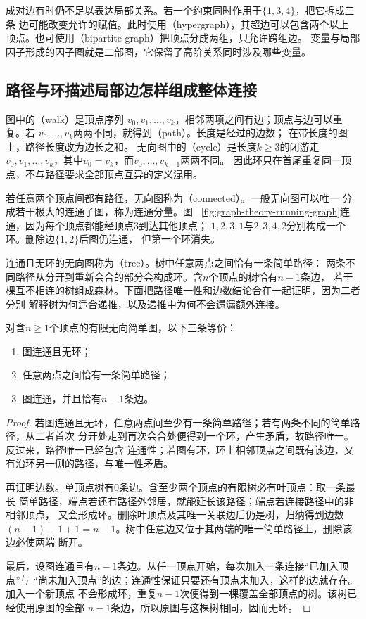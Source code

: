 成对边有时仍不足以表达局部关系。若一个约束同时作用于\(\{1,3,4\}\)，把它拆成三条
边可能改变允许的赋值。此时使用（hypergraph），其超边可以包含两个以上
顶点。也可使用（bipartite graph）把顶点分成两组，只允许跨组边。
变量与局部因子形成的因子图就是二部图，它保留了高阶关系同时涉及哪些变量。

\subsection{路径与环描述局部边怎样组成整体连接}

图中的（walk）是顶点序列
\(v_0,v_1,\ldots,v_k\)，相邻两项之间有边；顶点与边可以重复。若
\(v_0,\ldots,v_k\)两两不同，就得到（path）。长度是经过的边数；
在带长度的图上，路径长度改为边长之和。
无向图中的（cycle）是长度\(k\geq3\)的闭游走
\(v_0,v_1,\ldots,v_k\)，其中\(v_0=v_k\)，而\(v_0,\ldots,v_{k-1}\)两两不同。
因此环只在首尾重复同一顶点，不与路径要求全部顶点互异的定义混用。

若任意两个顶点间都有路径，无向图称为（connected）。一般无向图可以唯一
分成若干极大的连通子图，称为连通分量。图
~\ref{fig:graph-theory-running-graph}连通，因为每个顶点都能经顶点\(3\)到达其他顶点；
\(1,2,3,1\)与\(2,3,4,2\)分别构成一个环。删除边\(\{1,2\}\)后图仍连通，
但第一个环消失。

连通且无环的无向图称为（tree）。树中任意两点之间恰有一条简单路径：
两条不同路径从分开到重新会合的部分会构成环。含\(n\)个顶点的树恰有\(n-1\)条边，
若干棵互不相连的树组成森林。下面把路径唯一性和边数结论合在一起证明，因为二者分别
解释树为何适合递推，以及递推中为何不会遗漏额外连接。

\begin{theorem}[树的等价刻画]
  \label{thm:graph-theory-tree-characterizations}
  对含\(n\geq1\)个顶点的有限无向简单图，以下三条等价：
  \begin{enumerate}
    \item 图连通且无环；
    \item 任意两点之间恰有一条简单路径；
    \item 图连通，并且恰有\(n-1\)条边。
  \end{enumerate}
\end{theorem}

\begin{proof}
若图连通且无环，任意两点间至少有一条简单路径；若有两条不同的简单路径，从二者首次
分开处走到再次会合处便得到一个环，产生矛盾，故路径唯一。反过来，路径唯一已经包含
连通性；若图有环，环上相邻顶点之间既有该边，又有沿环另一侧的路径，与唯一性矛盾。

再证明边数。单顶点树有\(0\)条边。含至少两个顶点的有限树必有叶顶点：取一条最长
简单路径，端点若还有路径外邻居，就能延长该路径；端点若连接路径中的非相邻顶点，
又会形成环。删除叶顶点及其唯一关联边后仍是树，归纳得到边数
\((n-1)-1+1=n-1\)。树中任意边又位于其两端的唯一简单路径上，删除该边必使两端
断开。

最后，设图连通且有\(n-1\)条边。从任一顶点开始，每次加入一条连接“已加入顶点”与
“尚未加入顶点”的边；连通性保证只要还有顶点未加入，这样的边就存在。加入一个新顶点
不会形成环，重复\(n-1\)次便得到一棵覆盖全部顶点的树。该树已经使用原图的全部
\(n-1\)条边，所以原图与这棵树相同，因而无环。
\end{proof}

